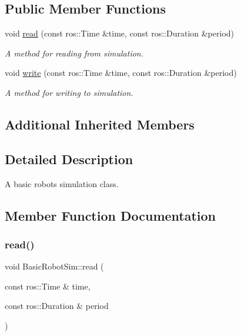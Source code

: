 \subsection*{Public Member Functions}
\begin{DoxyCompactItemize}
\item 
void \hyperlink{classBasicRobotSim_a074eed2efbdc51b211f62ac668706237}{read} (const ros\+::\+Time \&time, const ros\+::\+Duration \&period)
\begin{DoxyCompactList}\small\item\em A method for reading from simulation. \end{DoxyCompactList}\item 
void \hyperlink{classBasicRobotSim_a0efb3d3e006cd5c233e2e273d89e06f6}{write} (const ros\+::\+Time \&time, const ros\+::\+Duration \&period)
\begin{DoxyCompactList}\small\item\em A method for writing to simulation. \end{DoxyCompactList}\end{DoxyCompactItemize}
\subsection*{Additional Inherited Members}


\subsection{Detailed Description}
A basic robot\textquotesingle{}s simulation class. 

\subsection{Member Function Documentation}
\mbox{\label{classBasicRobotSim_a074eed2efbdc51b211f62ac668706237}} 
\subsubsection{\texorpdfstring{read()}{read()}}
{\footnotesize\ttfamily void Basic\+Robot\+Sim\+::read (\begin{DoxyParamCaption}\item[{const ros\+::\+Time \&}]{time,  }\item[{const ros\+::\+Duration \&}]{period }\end{DoxyParamCaption})\hspace{0.3cm}{\ttfamily [virtual]}}



